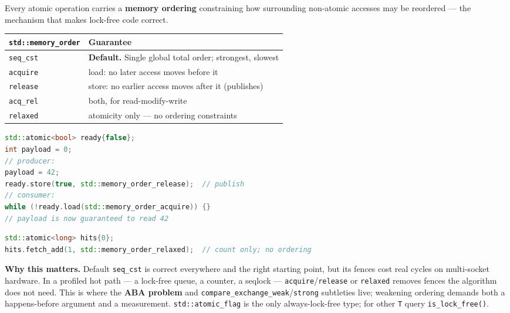 Every atomic operation carries a \textbf{memory ordering} constraining how surrounding non-atomic accesses may be reordered --- the mechanism that makes lock-free code correct.

\begin{center}
\begin{tabular}{|l|l|}
\hline \textbf{\texttt{std::memory\_order}} & \textbf{Guarantee} \\ \hline
\texttt{seq\_cst} & \textbf{Default.} Single global total order; strongest, slowest \\
\texttt{acquire}  & load: no later access moves before it \\
\texttt{release}  & store: no earlier access moves after it (publishes) \\
\texttt{acq\_rel} & both, for read-modify-write \\
\texttt{relaxed}  & atomicity only --- no ordering constraints \\
\hline
\end{tabular}
\end{center}

\begin{lstlisting}[language=C++, caption={acquire/release publishes data without a lock}]
std::atomic<bool> ready{false};
int payload = 0;
// producer:
payload = 42;
ready.store(true, std::memory_order_release);  // publish
// consumer:
while (!ready.load(std::memory_order_acquire)) {}
// payload is now guaranteed to read 42
\end{lstlisting}

\begin{lstlisting}[language=C++, caption={relaxed is enough for a pure counter}]
std::atomic<long> hits{0};
hits.fetch_add(1, std::memory_order_relaxed);  // count only; no ordering
\end{lstlisting}

\textbf{Why this matters.} Default \texttt{seq\_cst} is correct everywhere and the right starting point, but its fences cost real cycles on multi-socket hardware. In a profiled hot path --- a lock-free queue, a counter, a seqlock --- \texttt{acquire}/\texttt{release} or \texttt{relaxed} removes fences the algorithm does not need. This is where the \textbf{ABA problem} and \texttt{compare\_exchange\_weak}/\texttt{strong} subtleties live; weakening ordering demands both a happens-before argument and a measurement. \texttt{std::atomic\_flag} is the only always-lock-free type; for other \texttt{T} query \texttt{is\_lock\_free()}.

